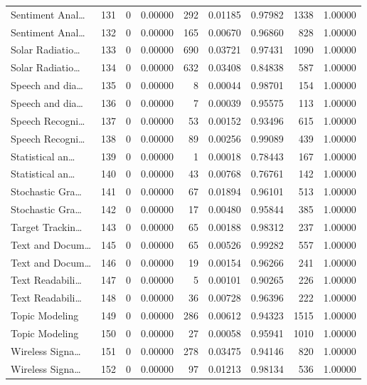 \begin{table}
\begin{tabular}{lrrrrrrrr}
Sentiment Anal… & 131 & 0 & 0.00000 & 292 & 0.01185 & 0.97982 & 1338 & 1.00000 \\
Sentiment Anal… & 132 & 0 & 0.00000 & 165 & 0.00670 & 0.96860 & 828 & 1.00000 \\
Solar Radiatio… & 133 & 0 & 0.00000 & 690 & 0.03721 & 0.97431 & 1090 & 1.00000 \\
Solar Radiatio… & 134 & 0 & 0.00000 & 632 & 0.03408 & 0.84838 & 587 & 1.00000 \\
Speech and dia… & 135 & 0 & 0.00000 & 8 & 0.00044 & 0.98701 & 154 & 1.00000 \\
Speech and dia… & 136 & 0 & 0.00000 & 7 & 0.00039 & 0.95575 & 113 & 1.00000 \\
Speech Recogni… & 137 & 0 & 0.00000 & 53 & 0.00152 & 0.93496 & 615 & 1.00000 \\
Speech Recogni… & 138 & 0 & 0.00000 & 89 & 0.00256 & 0.99089 & 439 & 1.00000 \\
Statistical an… & 139 & 0 & 0.00000 & 1 & 0.00018 & 0.78443 & 167 & 1.00000 \\
Statistical an… & 140 & 0 & 0.00000 & 43 & 0.00768 & 0.76761 & 142 & 1.00000 \\
Stochastic Gra… & 141 & 0 & 0.00000 & 67 & 0.01894 & 0.96101 & 513 & 1.00000 \\
Stochastic Gra… & 142 & 0 & 0.00000 & 17 & 0.00480 & 0.95844 & 385 & 1.00000 \\
Target Trackin… & 143 & 0 & 0.00000 & 65 & 0.00188 & 0.98312 & 237 & 1.00000 \\
Text and Docum… & 145 & 0 & 0.00000 & 65 & 0.00526 & 0.99282 & 557 & 1.00000 \\
Text and Docum… & 146 & 0 & 0.00000 & 19 & 0.00154 & 0.96266 & 241 & 1.00000 \\
Text Readabili… & 147 & 0 & 0.00000 & 5 & 0.00101 & 0.90265 & 226 & 1.00000 \\
Text Readabili… & 148 & 0 & 0.00000 & 36 & 0.00728 & 0.96396 & 222 & 1.00000 \\
Topic Modeling & 149 & 0 & 0.00000 & 286 & 0.00612 & 0.94323 & 1515 & 1.00000 \\
Topic Modeling & 150 & 0 & 0.00000 & 27 & 0.00058 & 0.95941 & 1010 & 1.00000 \\
Wireless Signa… & 151 & 0 & 0.00000 & 278 & 0.03475 & 0.94146 & 820 & 1.00000 \\
Wireless Signa… & 152 & 0 & 0.00000 & 97 & 0.01213 & 0.98134 & 536 & 1.00000 \\
\bottomrule
\end{tabular}
\end{table}
